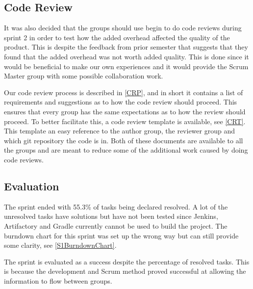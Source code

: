 \subsection{Code Review}
It was also decided that the groups should use begin to do code reviews during
sprint 2 in order to test how the added overhead affected the quality of the
product. This is despite the feedback from prior semester that suggests that
they found that the added overhead was not worth added quality. This is done
since it would be beneficial to make our own experiences and it would provide
the Scrum Master group with some possible collaboration work.\nl

Our code review process is described in \autoref{CRP}, and in short it contains
a list of requirements and suggestions as to how the code review should proceed.
This ensures that every group has the same expectations as to how the review
should proceed. To better facilitate this, a code review template is available,
see \autoref{CRT}. This template an easy reference to the author group, the
reviewer group and which git repository the code is in. Both of these documents
are available to all the groups and are meant to reduce some of the additional
work caused by doing code reviews.

\subsection{Evaluation}

The sprint ended with 55.3\% of tasks being declared resolved. A lot of the
unresolved tasks have solutions but have not been tested since Jenkins,
Artifactory and Gradle currently cannot be used to build the project. The
burndown chart for this sprint was set up the wrong way but can still provide
some clarity, see \autoref{S1BurndownChart}.


The sprint is evaluated as a success despite the percentage of resolved
tasks. This is because the development and Scrum method proved successful
at allowing the information to flow between groups.



